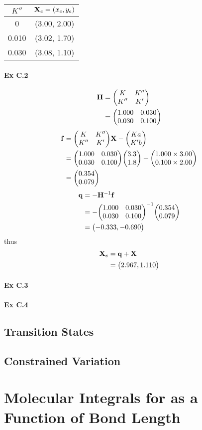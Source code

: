 \documentclass[a4paper]{article}
\newcommand{\ex}[1]{\paragraph{Ex #1}}
\numberwithin{equation}{subsection}
\begin{document}
\begin{table}
	\centering
	\begin{tabular}{cc}
		\hline
		$ K'' $ & $ \vb{X}_e = (x_e, y_e) $\\ \hline
		0 & (3.00, 2.00)\\
		0.010 & (3.02, 1.70)\\
		0.030 & (3.08, 1.10)\\ \hline
	\end{tabular}
\end{table}

\ex{C.2}
\begin{align}
\vb{H} 
&= \mqty(K & K'' \\ K'' & K') \notag\\
&= \mqty(1.000 & 0.030\\ 0.030 & 0.100)
\end{align}
\begin{align}
\vb{f} 
&= \mqty(K & K'' \\ K'' & K')\vb{X} - \mqty(K a \\ K' b) \notag\\
&= \mqty(1.000 & 0.030\\ 0.030 & 0.100)\mqty(3.3\\ 1.8) 
- \mqty(1.000\times 3.00\\ 0.100\times 2.00) \notag\\
&= \mqty(0.354\\ 0.079)
\end{align}
\begin{align}
\vb{q} &= -\vb{H}^{-1}\vb{f} \notag\\
&= -\mqty(1.000 & 0.030\\ 0.030 & 0.100)^{-1} \mqty(0.354\\ 0.079) \notag\\
&= \mqty(-0.333, -0.690)
\end{align}
thus
\begin{align}
\vb{X}_e &= \vb{q} + \vb{X} \notag\\
&= \mqty(2.967, 1.110)
\end{align}

\ex{C.3}

\ex{C.4}

\subsection{Transition States}

\subsection{Constrained Variation}

\section{Molecular Integrals for  as a Function of Bond Length}
\end{document}
